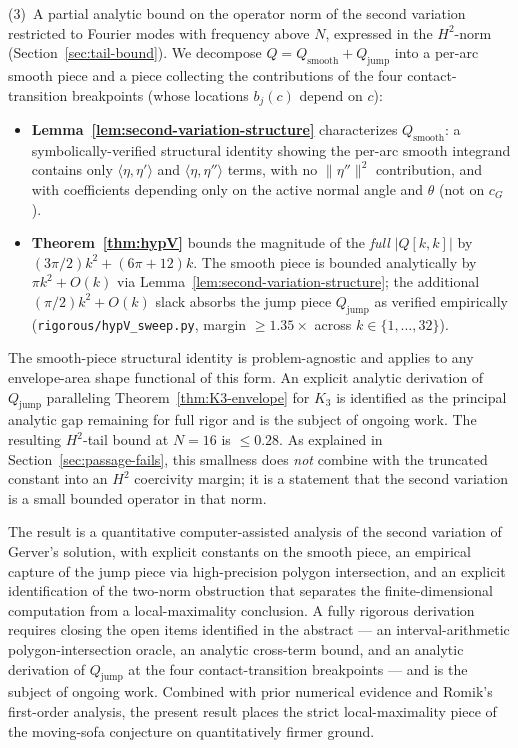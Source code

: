 \documentclass[11pt]{amsart}
\theoremstyle{plain}
\theoremstyle{definition}
\newcommand{\cG}{c_{G}}
\begin{document}
(3)~A partial analytic bound on the operator norm of the second
variation restricted to Fourier modes with frequency above $N$,
expressed in the $H^{2}$-norm (Section~\ref{sec:tail-bound}).
We decompose $Q = Q_{\mathrm{smooth}} + Q_{\mathrm{jump}}$ into a
per-arc smooth piece and a piece collecting the contributions of
the four contact-transition breakpoints (whose locations $b_{j}(c)$
depend on $c$):
\begin{itemize}
\item \textbf{Lemma~\ref{lem:second-variation-structure}}
      characterizes $Q_{\mathrm{smooth}}$:  a
      symbolically-verified structural identity showing the per-arc
      smooth integrand contains only $\langle \eta, \eta'\rangle$
      and $\langle \eta, \eta''\rangle$ terms, with no
      $\|\eta''\|^{2}$ contribution, and with coefficients depending
      only on the active normal angle and $\theta$ (not on $\cG$).
\item \textbf{Theorem~\ref{thm:hypV}} bounds the magnitude of the
      \emph{full} $|Q[k,k]|$ by $(3\pi/2)k^{2} + (6\pi+12)k$.  The
      smooth piece is bounded analytically by $\pi k^{2} + O(k)$
      via Lemma~\ref{lem:second-variation-structure}; the
      additional $(\pi/2)k^{2} + O(k)$ slack absorbs the jump
      piece $Q_{\mathrm{jump}}$ as verified empirically
      (\texttt{rigorous/hypV\_sweep.py}, margin $\geq 1.35\times$
      across $k \in \{1, \ldots, 32\}$).
\end{itemize}
The smooth-piece structural identity is problem-agnostic and
applies to any envelope-area shape functional of this form.  An
explicit analytic derivation of $Q_{\mathrm{jump}}$ paralleling
Theorem~\ref{thm:K3-envelope} for $K_{3}$ is identified as the
principal analytic gap remaining for full rigor and is the
subject of ongoing work.  The resulting $H^{2}$-tail bound at
$N=16$ is $\leq 0.28$.  As explained in
Section~\ref{sec:passage-fails}, this smallness does \emph{not}
combine with the truncated constant into an $H^{2}$ coercivity
margin; it is a statement that the second variation is a small
bounded operator in that norm.

The result is a quantitative computer-assisted analysis of the
second variation of Gerver's solution, with explicit
constants on the smooth piece, an
empirical capture of the jump piece via high-precision polygon
intersection, and an explicit identification of the two-norm
obstruction that separates the finite-dimensional computation from a
local-maximality conclusion.  A fully rigorous derivation requires closing the
open items identified in the abstract --- an interval-arithmetic
polygon-intersection oracle, an analytic cross-term bound, and an
analytic derivation of $Q_{\mathrm{jump}}$ at the four contact-transition
breakpoints --- and is the subject of ongoing work.  Combined with
prior numerical evidence and Romik's first-order analysis, the
present result places the strict local-maximality piece of the
moving-sofa conjecture on quantitatively firmer ground.
\end{document}
